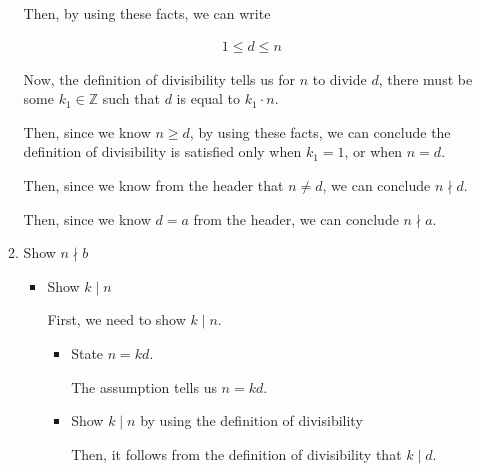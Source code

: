 \documentclass[12pt]{article}
\begin{document}
\begin{enumerate}[a.]
\begin{mdframed}
\begin{enumerate}[1.]
\begin{mdframed}
        Then, by using these facts, we can write

        \begin{align}
            1 \leq d \leq n
        \end{align}

        \bigskip

        Now, the definition of divisibility tells us for $n$ to
        divide $d$, there must be some $k_1 \in \mathbb{Z}$ such that
        $d$ is equal to $k_1 \cdot n$.

        \bigskip

        Then, since we know $n \geq d$, by using these facts, we can conclude
        the definition of divisibility is satisfied only when $k_1 = 1$, or
        when $n = d$.

        \bigskip

        Then, since we know from the header that $n \neq d$, we can conclude
        $n \nmid d$.

        \bigskip

        Then, since we know $d = a$ from the header, we can conclude $n \nmid a$.

        \end{mdframed}

        \item Show $n \nmid b$
        \begin{itemize}

            \item Show $k \mid n$

            \bigskip

            First, we need to show $k \mid n$.

            \bigskip

            \begin{itemize}
                \item State $n = kd$.
                \begin{mdframed}
                The assumption tells us $n = kd$.
                \end{mdframed}

                \item Show $k \mid n$ by using the definition of divisibility
                \begin{mdframed}
                Then, it follows from the definition of divisibility that $k \mid d$.
                \end{mdframed}
            \end{itemize}


\end{itemize}
\end{enumerate}
\end{mdframed}
\end{enumerate}
\end{document}
